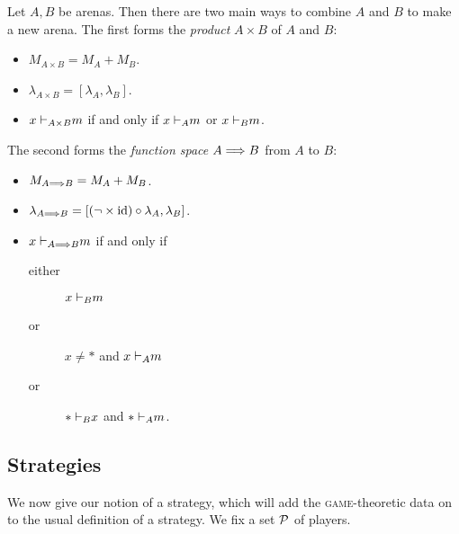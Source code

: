 \documentclass{article}
\newcommand{\game}{\textsc{game}}
\begin{document}
Let $A,B$ be arenas.  
Then there are two main ways to combine $A$ and $B$ to make a new arena.  
The first forms the \emph{product} $A\times B$ of $A$ and $B$:
\begin{itemize}
  \item $M_{A\times B} = M_A + M_B$.
  \item $\lambda_{A\times B} = [\lambda_A, \lambda_B]$.  
  \item $x\ts_{A\times B} m$ if and only if $x\ts_A m$ or $x\ts_B m$.
\end{itemize}
The second forms the \emph{function space} $A \iimpl B$ from $A$ to $B$:
\begin{itemize}
  \item $M_{A\iimpl B} = M_A + M_B$.
  \item $\lambda_{A\iimpl B} = [(\neg\times\id)\circ\lambda_A,\lambda_B]$.  
  \item $x\ts_{A\iimpl B} m$ if and only if
    \begin{description}
      \item[either] $x\ts_B m$
      \item[or] $x\ne *$ and $x\ts_A m$
      \item[or] $*\ts_B x$ and $*\ts_A m$.
    \end{description}
\end{itemize}

\subsection{Strategies}

We now give our notion of a strategy, which will add the \game{}-theoretic data on to the usual definition of a strategy.  
We fix a set $\P$ of players.
\end{document}
